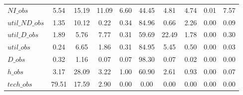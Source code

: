 \begin{center}
\begin{longtable}{lccccccccc}
$NI\_obs        $	 & 	         5.54	 & 	        15.19	 & 	        11.09	 & 	         6.60	 & 	        44.45	 & 	         4.81	 & 	         4.74	 & 	         0.01	 & 	         7.57 \\ 
$util\_ND\_obs  $	 & 	         1.35	 & 	        10.12	 & 	         0.22	 & 	         0.34	 & 	        84.96	 & 	         0.66	 & 	         2.26	 & 	         0.00	 & 	         0.09 \\ 
$util\_D\_obs   $	 & 	         1.89	 & 	         5.76	 & 	         7.77	 & 	         0.31	 & 	        59.69	 & 	        22.49	 & 	         1.78	 & 	         0.00	 & 	         0.30 \\ 
$util\_obs      $	 & 	         0.24	 & 	         6.65	 & 	         1.86	 & 	         0.31	 & 	        84.95	 & 	         5.45	 & 	         0.50	 & 	         0.00	 & 	         0.03 \\ 
$D\_obs         $	 & 	         0.32	 & 	         1.16	 & 	         0.07	 & 	         0.07	 & 	        98.30	 & 	         0.07	 & 	         0.02	 & 	         0.00	 & 	         0.00 \\ 
$h\_obs         $	 & 	         3.17	 & 	        28.09	 & 	         3.22	 & 	         1.00	 & 	        60.90	 & 	         2.61	 & 	         0.93	 & 	         0.00	 & 	         0.07 \\ 
$tech\_obs      $	 & 	        79.51	 & 	        17.59	 & 	         2.90	 & 	         0.00	 & 	         0.00	 & 	         0.00	 & 	         0.00	 & 	         0.00	 & 	         0.00 \\ 
\end{longtable}
 \end{center}
